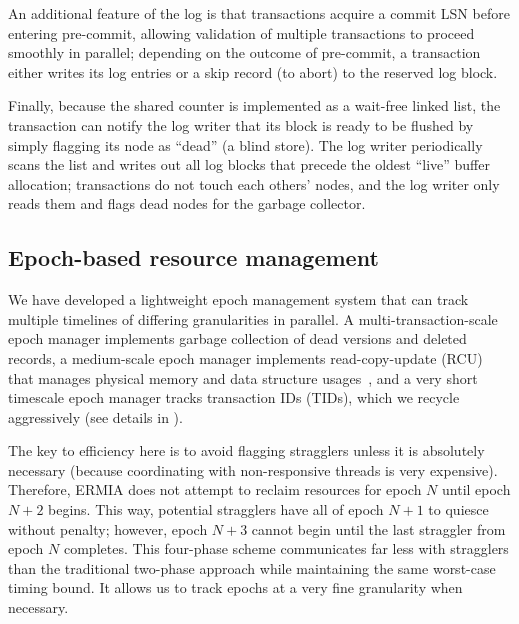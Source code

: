 An additional feature of the log is that transactions acquire a commit LSN before entering pre-commit, allowing validation of multiple transactions to proceed smoothly in parallel; depending on the outcome of pre-commit, a transaction either writes its log entries or a skip record (to abort) to the reserved log block.

Finally, because the shared counter is implemented as a wait-free linked list, the transaction can notify the log writer that its block is ready to be flushed by simply flagging its node as ``dead'' (a blind store). The log writer periodically scans the list and writes out all log blocks that precede the oldest ``live'' buffer allocation; transactions do not touch each others' nodes, and the log writer only reads them and flags dead nodes for the garbage collector.

\subsection{Epoch-based resource management}
 We have developed a lightweight epoch management system that can track multiple timelines of differing granularities in parallel. A multi-transaction-scale epoch manager implements garbage collection of dead versions and deleted records, a medium-scale epoch manager implements read-copy-update (RCU) that manages physical memory and data structure usages~\cite{McKenneyS98}, and a very short timescale epoch manager tracks transaction IDs (TIDs), which we recycle aggressively (see details in ).

The key to efficiency here is to avoid flagging stragglers unless it is absolutely necessary (because coordinating with non-responsive threads is very expensive). Therefore, ERMIA does not attempt to reclaim resources for epoch $N$ until epoch $N+2$ begins. This way, potential stragglers have all of epoch $N+1$ to quiesce without penalty; however, epoch $N+3$ cannot begin until the last straggler from epoch $N$ completes. This four-phase scheme communicates far less with stragglers than the traditional two-phase  approach while maintaining the same worst-case timing bound. It allows us to track epochs at a very fine granularity when necessary. 


